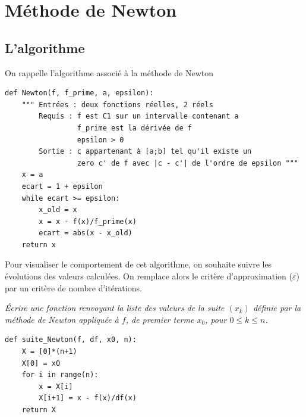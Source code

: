 \chapter{Méthode de Newton}
\thispagestyle{empty}

\section{L'algorithme}
On rappelle l'algorithme associé à la méthode de Newton

\begin{lstlisting}
def Newton(f, f_prime, a, epsilon):
    """ Entrées : deux fonctions réelles, 2 réels
        Requis : f est C1 sur un intervalle contenant a
                 f_prime est la dérivée de f
                 epsilon > 0
        Sortie : c appartenant à [a;b] tel qu'il existe un 
                 zero c' de f avec |c - c'| de l'ordre de epsilon """
    x = a
    ecart = 1 + epsilon
    while ecart >= epsilon:
        x_old = x
        x = x - f(x)/f_prime(x)
        ecart = abs(x - x_old)
    return x
\end{lstlisting}
Pour visualiser le comportement de cet algorithme, on souhaite suivre les évolutions des valeurs calculées. On remplace alors le critère d'approximation ($\varepsilon$) par un critère de nombre d'itérations.
\begin{Exercise}\it
Écrire une fonction  renvoyant la liste des  valeurs de la suite $(x_k)$ définie par la méthode de Newton appliquée à $f$, de premier terme $x_0$, pour $0 \le k \le n$.
\end{Exercise}
\begin{Answer}
\begin{lstlisting}
def suite_Newton(f, df, x0, n):
    X = [0]*(n+1)
    X[0] = x0
    for i in range(n):
        x = X[i]
        X[i+1] = x - f(x)/df(x)
    return X
\end{lstlisting}
\end{Answer}
